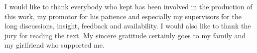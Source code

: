 \begin{preface}
I would like to thank everybody who kept has been involved in the production of this work, my promotor for his patience and especially my supervisors for the long discussions, insight, feedback and availability. I would also like to thank the jury for reading the text. My sincere gratitude certainly goes to my family and my girlfriend who supported me.
\end{preface}